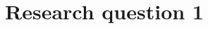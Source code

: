\documentclass[../main]{subfiles}
\begin{document}
\chapter{Research question 1}
\label{ch:reserach_question1}



\end{document}
